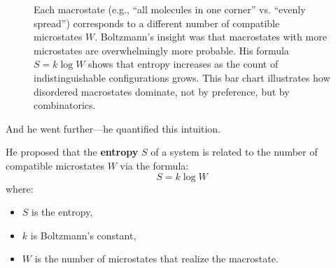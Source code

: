 \begin{figure}[H]
\centering
{}
\caption{
Each macrostate (e.g., “all molecules in one corner” vs. “evenly spread”) corresponds to a different number of compatible microstates \( W \). Boltzmann’s insight was that macrostates with more microstates are overwhelmingly more probable. His formula \( S = k \log W \) shows that entropy increases as the count of indistinguishable configurations grows. This bar chart illustrates how disordered macrostates dominate, not by preference, but by combinatorics.
}
\end{figure}






And he went further—he quantified this intuition.

He proposed that the \textbf{entropy} \( S \) of a system is related to the number of compatible microstates \( W \) via the formula:
\[
S = k \log W
\]
where:
\begin{itemize}
  \item \( S \) is the entropy,
  \item \( k \) is Boltzmann’s constant,
  \item \( W \) is the number of microstates that realize the macrostate.
\end{itemize}

